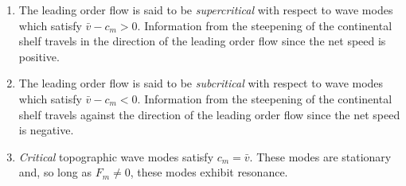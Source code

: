 \documentclass[12pt]{workjournal}
\begin{document}
\begin{enumerate}
\item  The leading order flow is said to be \textit{supercritical} with respect to wave modes which satisfy $\bar{v} - c_m > 0$. Information from the steepening of the continental shelf travels in the direction of the leading order flow since the net speed is positive.
\item The leading order flow is said to be \textit{subcritical} with respect to wave modes which satisfy $\bar{v} - c_m < 0$. Information from the steepening of the continental shelf travels against the direction of the leading order flow since the net speed is negative.
\item \textit{Critical} topographic wave modes satisfy $c_m = \bar{v}$. These modes are stationary and, so long as $F_m \neq 0$, these modes exhibit resonance.
\end{enumerate}
\end{document}
